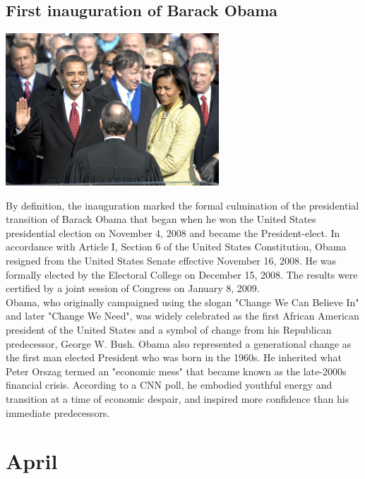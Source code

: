 \documentclass[11pt]{report}
\begin{document}
\subsection{First inauguration of Barack Obama}
\vspace{2mm}\begin{center}\includegraphics[width=8cm]{./img/obamaInaug.jpg}\end{center}
By definition, the inauguration marked the formal culmination of the presidential transition of Barack Obama that began when he won the United States presidential election on November 4, 2008 and became the President-elect. In accordance with Article I, Section 6 of the United States Constitution, Obama resigned from the United States Senate effective November 16, 2008. He was formally elected by the Electoral College on December 15, 2008. The results were certified by a joint session of Congress on January 8, 2009.\\
\indent Obama, who originally campaigned using the slogan "Change We Can Believe In" and later "Change We Need", was widely celebrated as the first African American president of the United States and a symbol of change from his Republican predecessor, George W. Bush. Obama also represented a generational change as the first man elected President who was born in the 1960s. He inherited what Peter Orszag termed an "economic mess" that became known as the late-2000s financial crisis. According to a CNN poll, he embodied youthful energy and transition at a time of economic despair, and inspired more confidence than his immediate predecessors.
\section{April}
\end{document}
